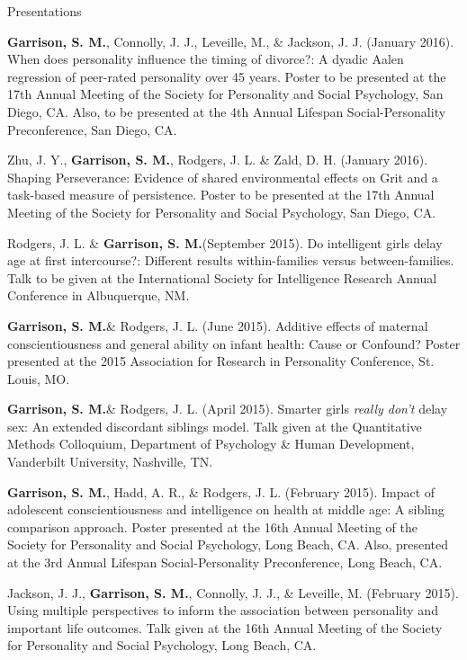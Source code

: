 \documentclass {resume}
\newlength{\wideitemsep}
\let\olditem\item
\renewcommand{\item}{\setlength{\itemsep}{\wideitemsep}\olditem}
\newcommand{\meb}{{\bf Garrison, S. M.}\xspace}
\begin{document}
\begin{rSection}{\textrm{Presentations}}\begin{etaremune}
\item\meb, Connolly, J. J., Leveille, M., \& Jackson, J. J. (January 2016). When does personality influence the timing of divorce?: A dyadic Aalen regression of peer-rated personality over 45 years. Poster to be presented at the 17th Annual Meeting of the Society for Personality and Social Psychology, San Diego, CA. Also, to be presented at the 4th Annual Lifespan Social-Personality  Preconference, San Diego, CA.
\item Zhu, J. Y., \meb, Rodgers, J. L. \& Zald, D. H. (January 2016). Shaping Perseverance: Evidence of shared environmental effects on Grit and a task-based measure of persistence. Poster to be presented at the 17th Annual Meeting of the Society for Personality and Social Psychology, San Diego, CA.
\item Rodgers, J. L. \& \meb (September 2015). Do intelligent girls delay age at first intercourse?:  Different results within-families versus between-families. Talk to be given at the International Society for Intelligence Research Annual Conference in Albuquerque, NM.
\item \meb \& Rodgers, J. L. (June 2015). Additive effects of maternal conscientiousness and general ability on infant health: Cause or Confound? Poster presented at the 2015 Association for Research in Personality Conference, St. Louis, MO.%
\item\meb \& Rodgers, J. L. (April 2015). Smarter girls \textit{really don't} delay sex: An extended discordant siblings model. Talk given at the Quantitative Methods Colloquium, Department of Psychology \& Human Development, Vanderbilt University, Nashville, TN.
\item \meb, Hadd, A. R., \& Rodgers, J. L. (February 2015). Impact of adolescent conscientiousness and intelligence on health at middle age: A sibling comparison approach. Poster presented at the 16th Annual Meeting of the Society for Personality and  Social Psychology, Long Beach, CA. Also, presented at the 3rd Annual Lifespan Social-Personality Preconference, Long Beach, CA.
\item Jackson, J. J., \textbf{Garrison, S. M.}, Connolly, J. J., \& Leveille, M. (February 2015). Using multiple perspectives to inform the association between personality and important life outcomes. Talk given at the 16th Annual Meeting of the Society for Personality and  Social Psychology, Long Beach, CA.

\end{etaremune}
\end{rSection}
\end{document}
